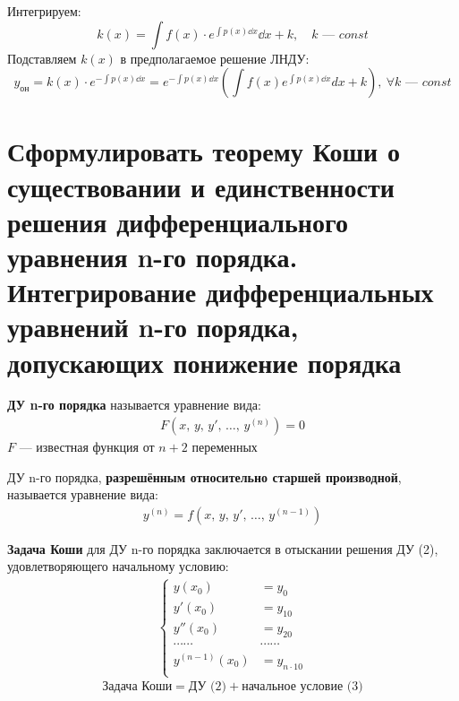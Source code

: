 Интегрируем:
\[
    k(x) = \int f(x)\cdot e^{\int p(x)\dd{x}}\dd{x} + k,\quad k \text{ --- } const
\]
Подставляем $k(x)$ в предполагаемое решение ЛНДУ:
\[
    y_{\text{он}} = k(x) \cdot e^{-\int p(x)\dd{x}} = e^{-\int p(x)\dd{x}} \left(\int f(x) e^{\int p(x)\dd{x}}dx + k\right),\ \forall k \text{ --- } const
\]

\section{Сформулировать теорему Коши о существовании и единственности решения дифференциального уравнения n-го порядка. Интегрирование дифференциальных уравнений n-го порядка, допускающих понижение порядка}
\setcounter{equation}{0}
\begin{definition}
    \textbf{ДУ n-го порядка} называется уравнение вида:
    \begin{gather}
        \boxed{F\left(x,\, y,\, y',\, \ldots,\, y^{(n)}\right) = 0}
    \end{gather}
    $F$ --- известная функция от $n+2$ переменных
\end{definition}

\begin{definition}
    ДУ n-го порядка, \textbf{разрешённым относительно старшей производной}, называется уравнение вида:
    \begin{gather}
        y^{(n)} = f\left(x,\, y,\, y',\, \ldots,\, y^{(n-1)}\right)
    \end{gather}
\end{definition}

\begin{definition}
    \textbf{Задача Коши} для ДУ n-го порядка заключается в отыскании решения ДУ (2), удовлетворяющего начальному условию:
    \begin{gather}
        \left\{ \begin{aligned}
            y(x_0) &= y_0 \\
            y'(x_0) &= y_{10} \\
            y''(x_0) &= y_{20} \\
            \cdots\cdots&\cdots\cdots \\
            y^{(n-1)}(x_0) &= y_{n\cdot 10} \\
        \end{aligned} \right.
    \end{gather}
    \[
        \text{Задача Коши} = \text{ДУ (2)} + \text{начальное условие (3)}
    \]
\end{definition}

